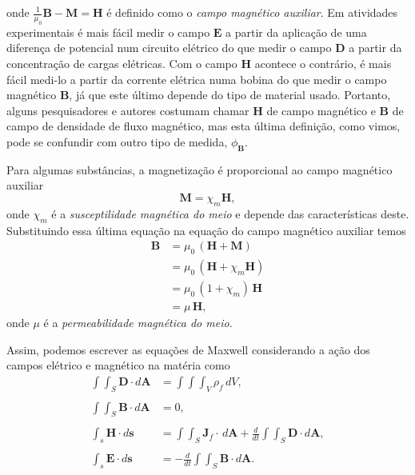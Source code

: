 onde $\frac{1}{\mu_0}\mathbf{B}-\mathbf{M}=\mathbf{H}$ \'e definido como o \textit{campo magn\'etico auxiliar}. Em atividades experimentais \'e mais f\'acil medir o campo 
$\mathbf{E}$ a partir da aplica\c{c}\~ao de uma diferen\c{c}a de potencial num circuito el\'etrico do que medir o campo $\mathbf{D}$ a partir da concentra\c{c}\~ao de cargas el\'etricas. Com o campo $\mathbf{H}$ acontece o contr\'ario, \'e mais f\'acil medi-lo a partir da corrente el\'etrica numa bobina do que medir o campo magn\'etico $\mathbf{B}$, j\'a que este \'ultimo depende do tipo de material usado. Portanto, alguns pesquisadores e autores costumam chamar $\mathbf{H}$ de campo magn\'etico e $\mathbf{B}$ de campo de densidade de fluxo magn\'etico, mas esta \'ultima defini\c{c}\~ao, como vimos, pode se confundir com outro tipo de medida, $\phi_\mathbf{B}$.

Para algumas subst\^ancias, a magnetiza\c{c}\~ao \'e proporcional ao campo magn\'etico auxiliar
\begin{equation*}
\mathbf{M}=\chi_m\mathbf{H},
\end{equation*}
onde $\chi_m$ \'e a \textit{susceptilidade magn\'etica do meio} e depende das caracter\'isticas deste. Substituindo essa \'ultima equa\c{c}\~ao na equa\c{c}\~ao do campo magn\'etico auxiliar temos
\begin{align*}
\mathbf{B}&=\mu_0\,(\mathbf{H}+\mathbf{M})\\
&=\mu_0\,(\mathbf{H}+\chi_m\mathbf{H})\\
&=\mu_0\,(1+\chi_m)\,\mathbf{H}\\
&=\mu\,\mathbf{H},
\end{align*}
onde $\mu$ \'e a \textit{permeabilidade magn\'etica do meio}.

Assim, podemos escrever as equa\c{c}\~oes de Maxwell considerando a a\c{c}\~ao dos campos el\'etrico e magn\'etico na mat\'eria como
\begin{align}\label{eq.max_meio_1}
\int\int_S\mathbf{D}\cdot d\mathbf{A}&=\int\int\int_{V}\rho_f\,dV,\\\nonumber\\\label{eq.max_meio_2}
\int\int_S\textbf{B}\cdot\textit{d}\textbf{A}&=0,\\\nonumber\\\label{eq.max_meio_3}
\int_s\mathbf{H}\cdot d\mathbf{s}&=\int\int_S\mathbf{J}_f\cdot\,d\mathbf{A}+\frac{d}{dt}\int\int_S\mathbf{D}\cdot\textit{d}\textbf{A},\\\nonumber\\\label{eq.max_meio_4}
\int_s\mathbf{E}\cdot d\mathbf{s}&=-\frac{d}{dt}\int\int_S\mathbf{B}\cdot d\mathbf{A}.
\end{align}

